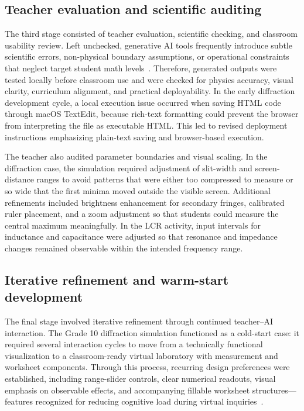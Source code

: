 \documentclass{iopjournal}
\begin{document}
\subsection{Teacher evaluation and scientific auditing}

The third stage consisted of teacher evaluation, scientific checking, and classroom usability review. Left unchecked, generative AI tools frequently introduce subtle scientific errors, non-physical boundary assumptions, or operational constraints that neglect target student math levels~\cite{liu2026}. Therefore, generated outputs were tested locally before classroom use and were checked for physics accuracy, visual clarity, curriculum alignment, and practical deployability. In the early diffraction development cycle, a local execution issue occurred when saving HTML code through macOS TextEdit, because rich-text formatting could prevent the browser from interpreting the file as executable HTML. This led to revised deployment instructions emphasizing plain-text saving and browser-based execution.

The teacher also audited parameter boundaries and visual scaling. In the diffraction case, the simulation required adjustment of slit-width and screen-distance ranges to avoid patterns that were either too compressed to measure or so wide that the first minima moved outside the visible screen. Additional refinements included brightness enhancement for secondary fringes, calibrated ruler placement, and a zoom adjustment so that students could measure the central maximum meaningfully. In the LCR activity, input intervals for inductance and capacitance were adjusted so that resonance and impedance changes remained observable within the intended frequency range.

\subsection{Iterative refinement and warm-start development}

The final stage involved iterative refinement through continued teacher--AI interaction. The Grade 10 diffraction simulation functioned as a cold-start case: it required several interaction cycles to move from a technically functional visualization to a classroom-ready virtual laboratory with measurement and worksheet components. Through this process, recurring design preferences were established, including range-slider controls, clear numerical readouts, visual emphasis on observable effects, and accompanying fillable worksheet structures—features recognized for reducing cognitive load during virtual inquiries~\cite{wieman2010}.
\end{document}
